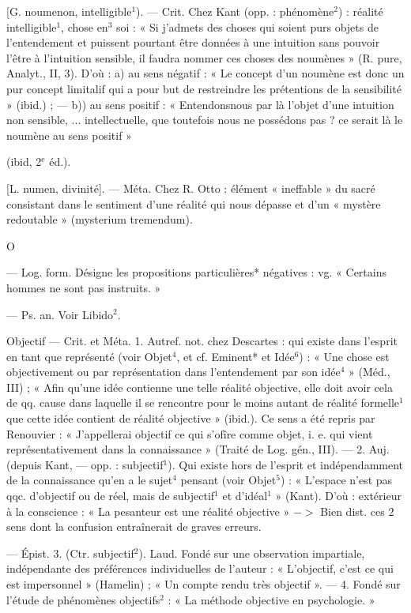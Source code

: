 \begin{itemize}[leftmargin=1cm, label=, itemsep=1pt]
 [G. noumenon, intelligible$^1$).
— Crit. Chez Kant (opp. : phénomène$^2$) : réalité intelligible$^1$, chose
%
en$^3$ soi : « Si j’admets des choses qui
soient purs objets de l’entendement
et puissent pourtant être données à
une intuition sans pouvoir l'être à
l'intuition sensible, il faudra nommer
ces choses des noumènes » (R. pure,
Analyt., II, 3). D'où : a) au sens
négatif : « Le concept d’un noumène
est donc un pur concept limitalif qui
a pour but de restreindre les prétentions de la sensibilité » (ibid.) ;
— b)) au sens positif : « Entendonsnous par là l’objet d’une intuition
non sensible, ... intellectuelle, que
toutefois nous ne possédons pas ? ce
serait là le noumène au sens positif »

(ibid, 2$^\text{e}$ éd.).

 [L. numen, divinité]. —
Méta. Chez R. Otto : élément « ineffable » du sacré consistant dans le
sentiment d’une réalité qui nous
dépasse et d’un « mystère redoutable » (mysterium tremendum).

\begin{center}
O
\end{center}

 — Log. form. Désigne les propositions particulières* négatives : vg.
« Certains hommes ne sont pas instruits. »

 — Ps. an. Voir Libido$^2$.

\ib{}Objectif — Crit. et Méta. 1. Autref.
not. chez Descartes : qui existe dans
l’esprit en tant que représenté (voir
Objet$^4$, et cf. Eminent* et Idée$^6$) :
« Une chose est objectivement ou
par représentation dans l’entendement par son idée$^4$ » (Méd., III) ;
« Afin qu’une idée contienne une
telle réalité objective, elle doit avoir
cela de qq. cause dans laquelle il se
rencontre pour le moins autant de
réalité formelle$^1$ que cette idée contient
de réalité objective » (ibid.).
Ce sens a été repris par Renouvier :
« J’appellerai objectif ce qui s’ofîre
comme objet, i. e. qui vient représentativement dans la connaissance » (Traité de Log. gén., III). —
2. Auj. (depuis Kant, — opp. : subjectif$^1$). Qui existe hors de l'esprit et
indépendamment de la connaissance qu’en a le sujet$^4$ pensant (voir
Objet$^5$) : « L’espace n’est pas qqc.
d'objectif ou de réel, mais de subjectif$^1$ et d’idéal$^1$ » (Kant). D'où :
extérieur à la conscience : « La pesanteur est une réalité objective »
$->$ Bien dist. ces 2 sens dont la
confusion entraînerait de graves
erreurs.

— Épist. 3. (Ctr. subjectif$^2$).
Laud. Fondé sur une observation
impartiale, indépendante des préférences individuelles de l’auteur :
« L'objectif, c’est ce qui est impersonnel » (Hamelin) ; « Un compte
rendu très objectif ». — 4. Fondé
sur l'étude de phénomènes objectifs$^2$ : « La méthode objective en
psychologie. »


\end{itemize}
